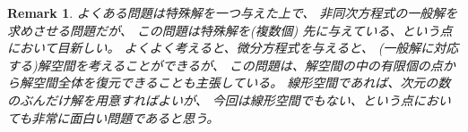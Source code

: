 \documentclass{jsarticle}
\newtheorem{remark}{Remark}
\begin{document}
\begin{remark}
よくある問題は特殊解を一つ与えた上で、
非同次方程式の一般解を求めさせる問題だが、
この問題は特殊解を(複数個)
先に与えている、という点において目新しい。
よくよく考えると、微分方程式を与えると、
(一般解に対応する)解空間を考えることができるが、
この問題は、解空間の中の有限個の点から解空間全体を復元できることも主張している。
線形空間であれば、次元の数のぶんだけ解を用意すればよいが、
今回は線形空間でもない、という点においても非常に面白い問題であると思う。
\end{remark}
\end{document}
